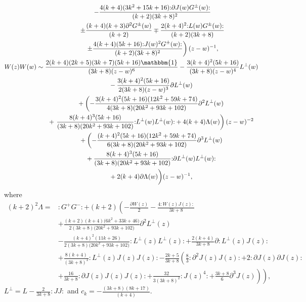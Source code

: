 \begin{gather*}
\phantom{ W(z)G^{\pm}(w) \sim }{}	 \left. - \frac{4(k+4)(3k^2+15k+16){:}\partial J(w)G^{\pm}(w){:}}{(k+2)(3k+8)^2}\right.\\
 \phantom{ W(z)G^{\pm}(w) \sim }{}\left. \pm \frac{(k+4)(k+3)\partial ^2G^{\pm}(w)}{(k+2)}\mp \frac{2(k+4)^2{:}L(w)G^{\pm}(w){:}}{(k+2)(3k+8)}\right. \\
	 \phantom{ W(z)G^{\pm}(w) \sim }{} \left. \pm \frac{4(k+4)(5k+16){:}J(w)^2G^{\pm}(w){:}}{(k+2)(3k+8)^2} \right)(z-w)^{-1} , \\
	 W(z)W(w) \sim \frac{2(k+4)(2k+5)(3k+7)(5k+16)\mathbbm{1}}{(3k+8)(z-w)^{6}} -\frac{3(k + 4)^2( 5 k + 16)}{(3k+8)(z-w)^{4}}L^{\perp}(w) \\
\phantom{W(z)W(w) \sim}{}	 -\frac{3(k + 4)^2( 5 k + 16)}{2(3k+8)(z-w)^{3}}\partial L^{\perp}(w) \\
\phantom{W(z)W(w) \sim}{}+\left( -\frac{3(k + 4)^2( 5 k + 16)(12k^2 + 59k + 74)}{4(3k+8)(20k^2 + 93k + 102)}\partial^2L ^{\perp}(w)\right. \\
\phantom{W(z)W(w) \sim}{}	 + \left. \frac{8(k + 4)^3( 5 k + 16)}{(3k+8)(20k^2 + 93k + 102)}{:}L^{\perp}(w)L^{\perp}(w){:} + 4 (k+4) \Lambda (w)\right) (z-w)^{-2} \\
\phantom{W(z)W(w) \sim}{}	 + \biggl( -\frac{(k + 4)^2( 5 k + 16)(12k^2 + 59k + 74)}{6(3k+8)(20k^2 + 93k + 102)}\partial ^3L^{\perp}(w) \\
\phantom{W(z)W(w) \sim}{}	 +   \frac{8(k + 4)^3( 5 k + 16)}{(3k+8)(20k^2 + 93k + 102)}{:}\partial L^{\perp}(w)L^{\perp}(w){:} \\
\phantom{W(z)W(w) \sim}{}  + 2 (k+4) \partial \Lambda(w)\biggr)(z-w)^{-1},
\end{gather*}
 where
 \begin{align*}
 	(k+2)^2\Lambda = {}&{:} G^+ G^-{:} + (k+2) \left(-\frac{\partial W(z)}{2} -\frac{4 {:}W(z)J(z){:}}{3k+8}\right. \\
 &\left.+ \frac{(k+2)(k+4)\bigl(6k^2+33k+46\bigr)}{2(3k+8)\bigl(20k^2+93k+102\bigr)}\partial^2L^{\perp}(z)\right. \\
 	 &- \left. \frac{(k+4)^2(11k+26)}{2(3k+8)\bigl(20k^2+93k+102\bigr)}{:}L^{\perp}(z)L^{\perp}(z){:} + \frac{2(k+4)}{3k+8}\partial {:}L^{\perp}(z)J(z){:} \right.\\
 	 &+ \left. \frac{8(k+4)}{(3k+8)^2}{:}L^{\perp}(z)J(z)J(z){:} - \frac{2k+5}{3k+8}\left(\frac{8}{3}{:}\partial ^2J(z)J(z){:} + 2{:}\partial J(z)\partial J(z){:}\right. \right. \\
 	 &+ \left. \left. \frac{16}{3k+8}{:}\partial J(z)J(z)J(z){:} + \frac{32}{3(3k+8)^2}{:}J(z)^4{:} + \frac{3k+8}{6}\partial ^3J(z)\right) \right),
 \end{align*}
 $L^{\perp} = L-\frac{2}{3k+8}{:}JJ{:}$ and $c_k = -\frac{(3k+8)(8k+17)}{(k+4)}$.
